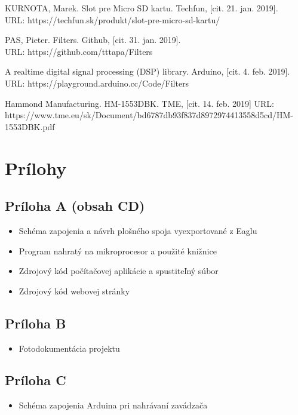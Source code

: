 \documentclass[titlepage,12pt]{article}
\begin{document}
\begin{enumerate}[label={[\arabic*]}]
\item KURNOTA, Marek. Slot pre Micro SD kartu. Techfun, [cit. 21. jan. 2019]. \\ URL: https://techfun.sk/produkt/slot-pre-micro-sd-kartu/
\item PAS, Pieter. Filters. Github, [cit. 31. jan. 2019]. \\ URL: https://github.com/tttapa/Filters
\item A realtime digital signal processing (DSP) library. Arduino, [cit. 4. feb. 2019]. \\ URL: https://playground.arduino.cc/Code/Filters
\item Hammond Manufacturing. HM-1553DBK. TME, [cit. 14. feb. 2019] URL: \\https://www.tme.eu/sk/Document/bd6787db93f837d8972974413558d5cd/HM-1553DBK.pdf
\end{enumerate}

\newpage
\section{Prílohy}
\subsection*{Príloha A (obsah CD)}
\begin{itemize}
	\item Schéma zapojenia a návrh plošného spoja vyexportované z Eaglu
	\item Program nahratý na mikroprocesor a použité knižnice
	\item Zdrojový kód počítačovej aplikácie a spustiteľný súbor
	\item Zdrojový kód webovej stránky
\end{itemize}
\subsection*{Príloha B}
\begin{itemize}
	\item Fotodokumentácia projektu
\end{itemize}
\subsection*{Príloha C}
\begin{itemize}
	\item Schéma zapojenia Arduina pri nahrávaní zavádzača
\end{itemize}
\end{document}
